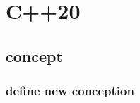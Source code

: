 \documentclass[a4paper,11pt,twoside]{book}
\begin{document}


\section{C++20}

\subsection{concept}

\subsubsection{define new conception}
\end{document}
